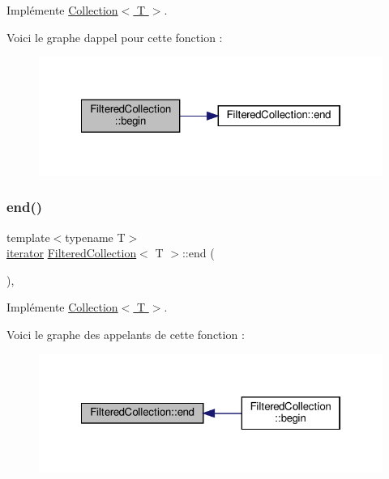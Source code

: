 Implémente \hyperlink{class_collection_a4abc73f8e31a499a22b25d42b7a4fe8c}{Collection$<$ T $>$}.

Voici le graphe d\textquotesingle{}appel pour cette fonction \+:
\nopagebreak
\begin{figure}[H]
\begin{center}
\leavevmode
\includegraphics[width=322pt]{class_filtered_collection_a114f2b1557201e523a264d549926ab0a_cgraph}
\end{center}
\end{figure}
\mbox{\label{class_filtered_collection_ae310c937df5035ef07f7d4de65fca18b}} 
\subsubsection{\texorpdfstring{end()}{end()}}
{\footnotesize\ttfamily template$<$typename T$>$ \\
\hyperlink{class_collection_a317dca4fdf1eb2e47643bb60c620f802}{iterator} \hyperlink{class_filtered_collection}{Filtered\+Collection}$<$ T $>$\+::end (\begin{DoxyParamCaption}{ }\end{DoxyParamCaption})\hspace{0.3cm}{\ttfamily [inline]}, {\ttfamily [virtual]}}



Implémente \hyperlink{class_collection_ab5b98f651d0f49cde1be067c69c52e89}{Collection$<$ T $>$}.

Voici le graphe des appelants de cette fonction \+:
\nopagebreak
\begin{figure}[H]
\begin{center}
\leavevmode
\includegraphics[width=322pt]{class_filtered_collection_ae310c937df5035ef07f7d4de65fca18b_icgraph}
\end{center}
\end{figure}


